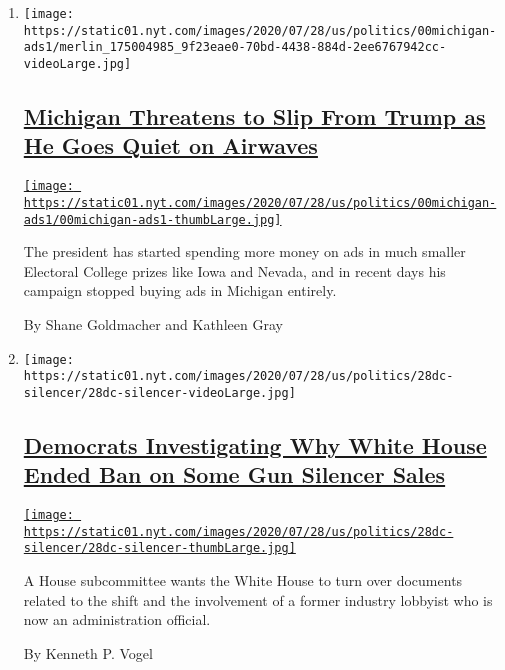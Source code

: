 \begin{enumerate}
\def\labelenumi{\arabic{enumi}.}
\item
  \texttt{[image: https://static01.nyt.com/images/2020/07/28/us/politics/00michigan-ads1/merlin\_175004985\_9f23eae0-70bd-4438-884d-2ee6767942cc-videoLarge.jpg]}

  \hypertarget{michigan-threatens-to-slip-from-trump-as-he-goes-quiet-on-airwaves}{%
  \subsection{\texorpdfstring{\href{/2020/07/29/us/politics/michigan-trump-biden-2020.html}{Michigan
  Threatens to Slip From Trump as He Goes Quiet on
  Airwaves}}{Michigan Threatens to Slip From Trump as He Goes Quiet on Airwaves}}\label{michigan-threatens-to-slip-from-trump-as-he-goes-quiet-on-airwaves}}

  \href{/2020/07/29/us/politics/michigan-trump-biden-2020.html}{\texttt{[image: https://static01.nyt.com/images/2020/07/28/us/politics/00michigan-ads1/00michigan-ads1-thumbLarge.jpg]}}

  The president has started spending more money on ads in much smaller
  Electoral College prizes like Iowa and Nevada, and in recent days his
  campaign stopped buying ads in Michigan entirely.

  By Shane Goldmacher and Kathleen Gray
\item
  \texttt{[image: https://static01.nyt.com/images/2020/07/28/us/politics/28dc-silencer/28dc-silencer-videoLarge.jpg]}

  \hypertarget{democrats-investigating-why-white-house-ended-ban-on-some-gun-silencer-sales}{%
  \subsection{\texorpdfstring{\href{/2020/07/28/us/politics/gun-silencers-democrats-trump.html}{Democrats
  Investigating Why White House Ended Ban on Some Gun Silencer
  Sales}}{Democrats Investigating Why White House Ended Ban on Some Gun Silencer Sales}}\label{democrats-investigating-why-white-house-ended-ban-on-some-gun-silencer-sales}}

  \href{/2020/07/28/us/politics/gun-silencers-democrats-trump.html}{\texttt{[image: https://static01.nyt.com/images/2020/07/28/us/politics/28dc-silencer/28dc-silencer-thumbLarge.jpg]}}

  A House subcommittee wants the White House to turn over documents
  related to the shift and the involvement of a former industry lobbyist
  who is now an administration official.

  By Kenneth P. Vogel
\end{enumerate}

